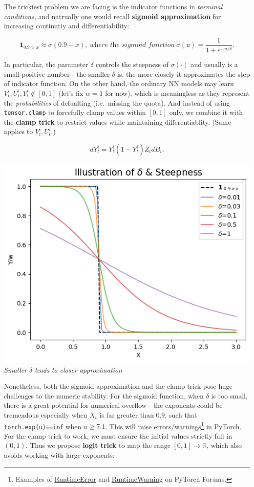 \documentclass[
]{article}
\begin{document}
The trickiest problem we are facing is the indicator functions in
\emph{terminal conditions}, and natrually one would recall
\textbf{sigmoid approximation} for increasing continutiy and
differentiability:

\[\mathbf{1}_{0.9>x} \approx \sigma(0.9-x), ~\textit{where the sigmoid function}~\sigma(u)=\frac{1}{1+e^{-u/\delta}}.\]

In particular, the parameter \(\delta\) controls the steepness of
\(\sigma(\cdot)\) and usually is a small positive number - the smaller
\(\delta\) is, the more closely it approximates the step of indicator
function. On the other hand, the ordinary NN models may learn
\(V_t^i,U_t^i,Y_t^i \notin [0,1]\) (let's fix \(w=1\) for now), which is
meaningless as they represent the \emph{probabilities} of defualting
(i.e.~missing the quota). And instead of using \texttt{tensor.clamp} to
forcefully clamp values within \([0,1]\) only, we combine it with the
\textbf{clamp trick} to restrict values while maintaining
differentiablity. (Same applies to \(V_t^i, U_t^i\).)

\[dY_t^i=Y_t^i(1-Y_t^i)Z_tdB_t.\]

\includegraphics{Illustration_diagrams/SigmoidApprox.png} \emph{Smaller
\(\delta\) leads to closer approximation}

Nonetheless, both the sigmoid approximation and the clamp trick pose
huge challenges to the numeric stability. For the sigmoid function, when
\(\delta\) is too small, there is a great potential for numerical
overflow - the exponents could be tremendous especially when \(X_t\) is
far greater than 0.9, such that \texttt{torch.exp(u)==inf} when
\(u \ge 7.1\). This will raise errors/warnings\footnote{Examples of
  \href{https://discuss.pytorch.org/t/second-order-derivative-with-nan-value-runtimeerror-function-sigmoidbackwardbackward0-returned-nan-values-in-its-0th-output/173260}{RuntimeError}
  and
  \href{https://discuss.pytorch.org/t/output-overflow-and-unstablity-when-use-model-eval/3668}{RuntimeWarning}
  on PyTorch Forums.} in PyTorch. For the clamp trick to work, we must
ensure the initial values strictly fall in \((0,1)\). Thus we propose
\textbf{logit trick} to map the range \([0,1] \to \mathbb{R}\), which
also avoids working with large exponents:
\end{document}
